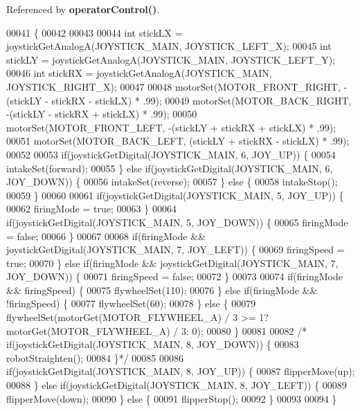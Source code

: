 Referenced by \textbf{ operator\+Control()}.


\begin{DoxyCode}
00041              \{
00042 
00043 
00044   \textcolor{keywordtype}{int} stickLX = joystickGetAnalogA(JOYSTICK_MAIN, JOYSTICK_LEFT_X);
00045   \textcolor{keywordtype}{int} stickLY = joystickGetAnalogA(JOYSTICK_MAIN, JOYSTICK_LEFT_Y);
00046   \textcolor{keywordtype}{int} stickRX = joystickGetAnalogA(JOYSTICK_MAIN, JOYSTICK_RIGHT_X);
00047 
00048   motorSet(MOTOR_FRONT_RIGHT, -(stickLY - stickRX - stickLX) * .99);
00049   motorSet(MOTOR_BACK_RIGHT, -(stickLY - stickRX + stickLX) * .99);
00050   motorSet(MOTOR_FRONT_LEFT, -(stickLY + stickRX + stickLX) * .99);
00051   motorSet(MOTOR_BACK_LEFT, (stickLY + stickRX - stickLX) * .99);
00052 
00053   \textcolor{keywordflow}{if}(joystickGetDigital(JOYSTICK_MAIN, 6, JOY_UP)) \{
00054     intakeSet(forward);
00055   \} \textcolor{keywordflow}{else} \textcolor{keywordflow}{if}(joystickGetDigital(JOYSTICK_MAIN, 6, JOY_DOWN)) \{
00056     intakeSet(reverse);
00057   \} \textcolor{keywordflow}{else} \{
00058     intakeStop();
00059   \}
00060 
00061   \textcolor{keywordflow}{if}(joystickGetDigital(JOYSTICK_MAIN, 5, JOY_UP)) \{
00062     firingMode = \textcolor{keyword}{true};
00063   \}
00064   \textcolor{keywordflow}{if}(joystickGetDigital(JOYSTICK_MAIN, 5, JOY_DOWN)) \{
00065     firingMode = \textcolor{keyword}{false};
00066   \}
00067 
00068   \textcolor{keywordflow}{if}(firingMode && joystickGetDigital(JOYSTICK_MAIN, 7, JOY_LEFT)) \{
00069     firingSpeed = \textcolor{keyword}{true};
00070   \} \textcolor{keywordflow}{else} \textcolor{keywordflow}{if}(firingMode && joystickGetDigital(JOYSTICK_MAIN, 7, JOY_DOWN)) \{
00071     firingSpeed = \textcolor{keyword}{false};
00072   \}
00073 
00074   \textcolor{keywordflow}{if}(firingMode && firingSpeed) \{
00075     flywheelSet(110);
00076   \} \textcolor{keywordflow}{else} \textcolor{keywordflow}{if}(firingMode && !firingSpeed) \{
00077     flywheelSet(60);
00078   \} \textcolor{keywordflow}{else} \{
00079     flywheelSet(motorGet(MOTOR_FLYWHEEL_A) / 3 >= 1? motorGet(MOTOR_FLYWHEEL_A) / 3: 0);
00080   \}
00081 
00082 \textcolor{comment}{/*  if(joystickGetDigital(JOYSTICK\_MAIN, 8, JOY\_DOWN)) \{}
00083 \textcolor{comment}{    robotStraighten();}
00084 \textcolor{comment}{  \}*/}
00085 
00086   \textcolor{keywordflow}{if}(joystickGetDigital(JOYSTICK_MAIN, 8, JOY_UP)) \{
00087     flipperMove(up);
00088   \}  \textcolor{keywordflow}{else} \textcolor{keywordflow}{if}(joystickGetDigital(JOYSTICK_MAIN, 8, JOY_LEFT)) \{
00089     flipperMove(down);
00090   \} \textcolor{keywordflow}{else} \{
00091     flipperStop();
00092   \}
00093 
00094 \}
\end{DoxyCode}
\mbox{\label{drive_8h_a8fb87ee769c5cb856ac57381622779b0}} 

